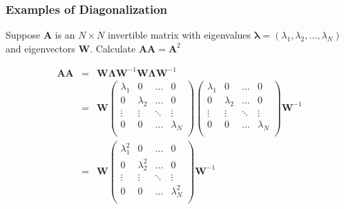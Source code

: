 \documentclass{beamer}
\numberwithin{equation}{section}
\begin{document}
\begin{frame}
\frametitle{Examples of Diagonalization}

Suppose $\boldsymbol{A}$ is an $N \times N$ invertible matrix with eigenvalues $\boldsymbol{\lambda} = (\lambda_{1}, \lambda_{2}, \hdots, \lambda_{N})$ and eigenvectors $\boldsymbol{W}$.  Calculate $\boldsymbol{A} \boldsymbol{A} = \boldsymbol{A}^{2}$ 

\begin{eqnarray}
\boldsymbol{A}\boldsymbol{A} & = & \boldsymbol{W} \boldsymbol{\Lambda} \boldsymbol{W}^{-1} \boldsymbol{W} \boldsymbol{\Lambda} \boldsymbol{W}^{-1} \nonumber \\
& = &  \boldsymbol{W} \begin{pmatrix}
\lambda_{1} & 0 & \hdots & 0 \\
0 & \lambda_{2} & \hdots & 0 \\
\vdots & \vdots & \ddots & \vdots \\
0 & 0&  \hdots & \lambda_{N}\\
\end{pmatrix} \begin{pmatrix}
\lambda_{1} & 0 & \hdots & 0 \\
0 & \lambda_{2} & \hdots & 0 \\
\vdots & \vdots & \ddots & \vdots \\
0 & 0&  \hdots & \lambda_{N}\\
\end{pmatrix} \boldsymbol{W}^{-1} \nonumber \\
& = & \boldsymbol{W} \begin{pmatrix}
\lambda_{1}^{2} & 0 & \hdots & 0 \\
0 & \lambda_{2}^{2} & \hdots & 0 \\
\vdots & \vdots & \ddots & \vdots \\
0 & 0&  \hdots & \lambda_{N}^{2} \\
\end{pmatrix} \boldsymbol{W}^{-1} \nonumber 
\end{eqnarray}




\end{frame}
\end{document}
